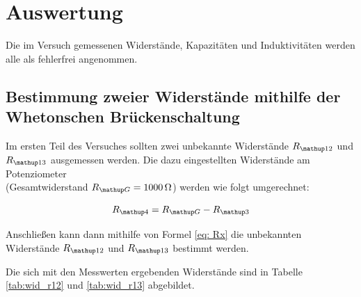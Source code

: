 \newpage
\section{Auswertung}

Die im Versuch gemessenen Widerstände, Kapazitäten und Induktivitäten
werden alle als fehlerfrei angenommen.

\subsection{Bestimmung zweier Widerstände mithilfe der Whetonschen Brückenschaltung}

Im ersten Teil des Versuches sollten zwei unbekannte Widerstände $R_{\map{12}}$ und $R_{\map{13}}$ ausgemessen werden.
Die dazu eingestellten Widerstände am Potenziometer \\ (Gesamtwiderstand 
$R_{\map{G}}=\SI{1000}{\ohm}$) werden wie folgt umgerechnet:

\begin{equation*}
R\ua{4}=R\ua{G}-R_{\map{3}}
\end{equation*}

Anschließen kann dann mithilfe von Formel \eqref{eq: Rx} die 
unbekannten Widerstände $R_{\map{12}}$ und $R_{\map{13}}$ bestimmt werden. 

Die sich mit den Messwerten ergebenden Widerstände sind in Tabelle \ref{tab:wid_r12} und
\ref{tab:wid_r13} abgebildet. 

